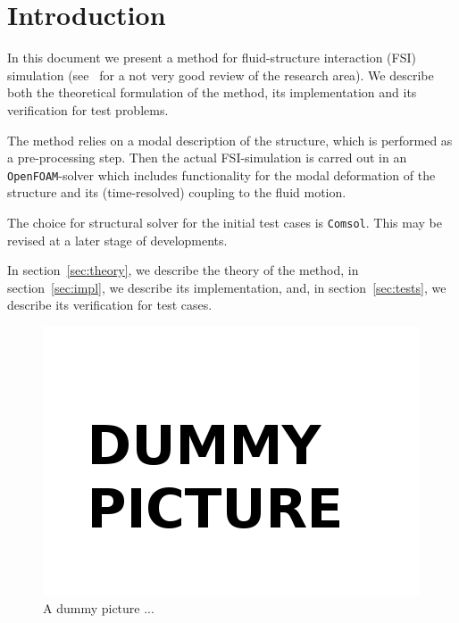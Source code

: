 \section{Introduction} \label{sec:intro}

In this document we present a method for fluid-structure interaction (FSI) simulation
(see~\cite{DH:1} for a not very good review of the research area).
We describe both the theoretical formulation of the method, its implementation
and its verification for test problems.

The method relies on a modal description of the structure, which is performed
as a pre-processing step. Then the actual FSI-simulation is carred out in
an \texttt{OpenFOAM}-solver which includes functionality for the modal deformation
of the structure and its (time-resolved) coupling to the fluid motion.

The choice for structural solver for the initial test cases is \texttt{Comsol}.
This may be revised at a later stage of developments.

In section~\ref{sec:theory}, we describe the theory of the method,
in section~\ref{sec:impl}, we describe its implementation, and, in section~\ref{sec:tests},
we describe its verification for test cases.

\begin{figure}[htbp!]
\centering
\includegraphics[width=0.5\linewidth]{figures/dummy}
\caption{A dummy picture ...}
\end{figure}
